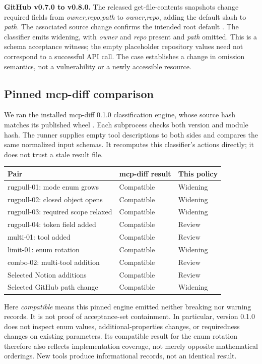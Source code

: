 \textbf{GitHub v0.7.0 to v0.8.0.} The released get-file-contents snapshots change required fields from \emph{owner,repo,path} to \emph{owner,repo}, adding the default slash to \emph{path}. The associated source change confirms the intended root default \citep{github-path}. The classifier emits widening, with \emph{owner} and \emph{repo} present and \emph{path} omitted. This is a schema acceptance witness; the empty placeholder repository values need not correspond to a successful API call. The case establishes a change in omission semantics, not a vulnerability or a newly accessible resource.

\subsection{Pinned mcp-diff comparison}\label{pinned-mcp-diff-comparison}

We ran the installed mcp-diff 0.1.0 classification engine, whose source hash matches its published wheel \citep{mcp-diff}. Each subprocess checks both version and module hash. The runner supplies empty tool descriptions to both sides and compares the same normalized input schemas. It recomputes this classifier's actions directly; it does not trust a stale result file.

{\def\LTcaptype{none} %
\begin{longtable}[]{@{}lll@{}}
\toprule\noalign{}
Pair & mcp-diff result & This policy \\
\midrule\noalign{}
\endhead
\bottomrule\noalign{}
\endlastfoot
rugpull-01: mode enum grows & Compatible & Widening \\
rugpull-02: closed object opens & Compatible & Widening \\
rugpull-03: required scope relaxed & Compatible & Widening \\
rugpull-04: token field added & Compatible & Review \\
multi-01: tool added & Compatible & Review \\
limit-01: enum rotation & Compatible & Widening \\
combo-02: multi-tool addition & Compatible & Review \\
Selected Notion additions & Compatible & Review \\
Selected GitHub path change & Compatible & Widening \\
\end{longtable}
}

Here \emph{compatible} means this pinned engine emitted neither breaking nor warning records. It is not proof of acceptance-set containment. In particular, version 0.1.0 does not inspect enum values, additional-properties changes, or requiredness changes on existing parameters. Its compatible result for the enum rotation therefore also reflects implementation coverage, not merely opposite mathematical orderings. New tools produce informational records, not an identical result.

